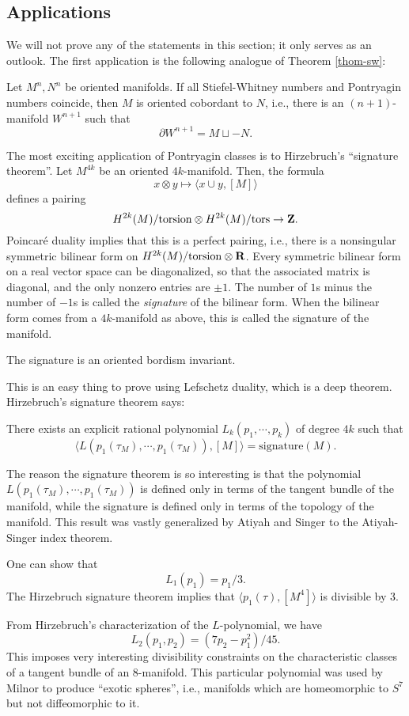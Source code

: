 \subsection{Applications}
We will not prove any of the statements in this section; it only serves as an
outlook. The first application is the following analogue of Theorem
\ref{thom-sw}:
\begin{theorem}[Wall]
    Let $M^n,N^n$ be oriented manifolds. If all Stiefel-Whitney numbers and
    Pontryagin numbers coincide, then $M$ is oriented cobordant to $N$, i.e.,
    there is an $(n+1)$-manifold $W^{n+1}$ such that
    $$\partial W^{n+1} = M\sqcup -N.$$
\end{theorem}
The most exciting application of Pontryagin classes is to Hirzebruch's
``signature theorem''. Let $M^{4k}$ be an oriented $4k$-manifold. Then, the
formula
$$x\otimes y\mapsto\langle x\cup y,[M]\rangle$$
defines a pairing
$$H^{2k}(M)/\mathrm{torsion}\otimes H^{2k}(M)/\mathrm{tors}\to \mathbf Z.$$
Poincar\'e duality implies that this is a perfect pairing, i.e., there is a
nonsingular symmetric bilinear form on $H^{2k}(M)/\mathrm{torsion}\otimes \mathbf R$.
Every symmetric bilinear form on a real vector space can be diagonalized, so
that the associated matrix is diagonal, and the only nonzero entries are $\pm
1$. The number of $1$s minus the number of $-1$s is called the \emph{signature}
of the bilinear form. When the bilinear form comes from a $4k$-manifold as
above, this is called the signature of the manifold.
\begin{lemma}[Thom]
    The signature is an oriented bordism invariant.
\end{lemma}
This is an easy thing to prove using Lefschetz duality, which is a deep
theorem. Hirzebruch's signature theorem says:
\begin{theorem}
    There exists an explicit rational polynomial $L_k(p_1,\cdots,p_k)$ of
    degree $4k$ such that
    $$\langle L(p_1(\tau_M),\cdots,p_1(\tau_M)),[M]\rangle =
    \mathrm{signature}(M).$$
\end{theorem}
The reason the signature theorem is so interesting is that the polynomial
$L(p_1(\tau_M),\cdots,p_1(\tau_M))$ is defined only in terms of the tangent
bundle of the manifold, while the signature is defined only in terms of the
topology of the manifold. This result was vastly generalized by Atiyah and
Singer to the Atiyah-Singer index theorem.
\begin{example}
    One can show that 
    $$L_1(p_1) = p_1/3.$$
    The Hirzebruch signature theorem implies that $\langle
    p_1(\tau),[M^4]\rangle$ is divisible by $3$.
\end{example}
\begin{example}
    From Hirzebruch's characterization of the $L$-polynomial, we have
    $$L_2(p_1,p_2) = (7p_2 - p_1^2)/45.$$
    This imposes very interesting divisibility constraints on the
    characteristic classes of a tangent bundle of an $8$-manifold. This
    particular polynomial was used by Milnor to produce ``exotic spheres'',
    i.e., manifolds which are homeomorphic to $S^7$ but not diffeomorphic to
    it.
\end{example}
